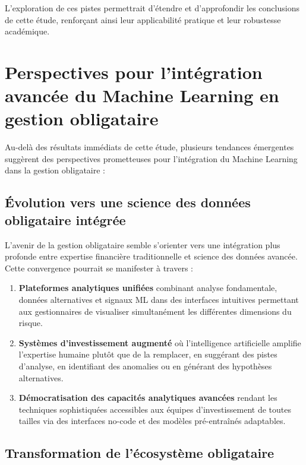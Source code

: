 L'exploration de ces pistes permettrait d'étendre et d'approfondir les conclusions de cette étude, renforçant ainsi leur applicabilité pratique et leur robustesse académique.

\section*{Perspectives pour l'intégration avancée du Machine Learning en gestion obligataire}

Au-delà des résultats immédiats de cette étude, plusieurs tendances émergentes suggèrent des perspectives prometteuses pour l'intégration du Machine Learning dans la gestion obligataire :

\subsection*{Évolution vers une science des données obligataire intégrée}

L'avenir de la gestion obligataire semble s'orienter vers une intégration plus profonde entre expertise financière traditionnelle et science des données avancée. Cette convergence pourrait se manifester à travers :

\begin{enumerate}
  \item \textbf{Plateformes analytiques unifiées} combinant analyse fondamentale, données alternatives et signaux ML dans des interfaces intuitives permettant aux gestionnaires de visualiser simultanément les différentes dimensions du risque.

  \item \textbf{Systèmes d'investissement augmenté} où l'intelligence artificielle amplifie l'expertise humaine plutôt que de la remplacer, en suggérant des pistes d'analyse, en identifiant des anomalies ou en générant des hypothèses alternatives.

  \item \textbf{Démocratisation des capacités analytiques avancées} rendant les techniques sophistiquées accessibles aux équipes d'investissement de toutes tailles via des interfaces no-code et des modèles pré-entraînés adaptables.
\end{enumerate}

\subsection*{Transformation de l'écosystème obligataire}

